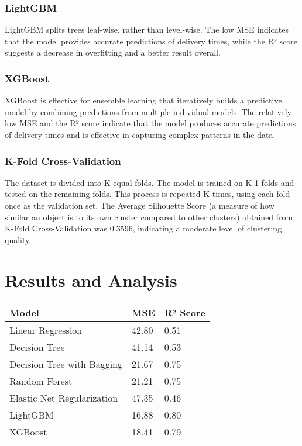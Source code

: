 \documentclass[10pt,twocolumn,letterpaper]{article}
\begin{document}
        \subsubsection{LightGBM}
            LightGBM splits trees leaf-wise, rather than level-wise.
            The low MSE indicates that the model provides accurate predictions of delivery times, while the R² score suggests a decrease in overfitting and a better result overall.

        \subsubsection{XGBoost}
            XGBoost is effective for ensemble learning that iteratively builds a predictive model by combining predictions from multiple individual models. The relatively low MSE and the R² score indicate that the model produces accurate predictions of delivery times and is effective in capturing complex patterns in the data.

        \subsubsection{K-Fold Cross-Validation}
          The dataset is divided into K equal folds. The model is trained on K-1 folds and tested on the remaining folds. This process is repeated K times, using each fold once as the validation set. The Average Silhouette Score (a measure of how similar an object is to its own cluster compared to other clusters) obtained from K-Fold Cross-Validation was 0.3596, indicating a moderate level of clustering quality.

\section{Results and Analysis}

    \begin{table}[h!]
        \centering
        \begin{tabular}{|l|l|l|}
            \hline
            \textbf{Model} & \textbf{MSE} & \textbf{R² Score} \\ \hline
            Linear Regression              & 42.80     & 0.51      \\ \hline
            Decision Tree                  & 41.14     & 0.53      \\ \hline
            Decision Tree with Bagging     & 21.67     & 0.75      \\ \hline
            Random Forest                  & 21.21     & 0.75      \\ \hline
            Elastic Net Regularization     & 47.35     & 0.46      \\ \hline
            LightGBM                      & 16.88     & 0.80      \\ \hline
            XGBoost                       & 18.41     & 0.79      \\ \hline
        \end{tabular}
        \label{tab:model_metrics}
    \end{table}
\end{document}
